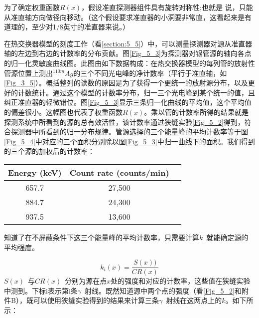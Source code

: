 为了确定权重函数$R(x)$，假设准直探测器组件具有旋转对称性;也就是 说，只能从准直轴方向做径向移动。（这个假设要求准直器的小洞要非常直，这看起来是有道理的，至少对1/8英寸的准直器来说。）

在热交换器模型的刻度工作（看\ref{section:5_5}）中，可以测量探测器对源从准直器轴的左边到右边的计数率的分布贡献。图\ref{Fig_5_3}为探测器对银管源的轴向各点的归一化灵敏度曲线图。此图由如下数据构成：在热交换器模型的每列管的放射性管源位置上测出$^{110m}Ag$的三个不同光电峰的净计数率（平行于准直轴，如\ref{Fig_3_5}）。概括整列的读数的原因是为了获得一个更统一的放射源分布，以及更好的计数统计。通过这个模型的计数率分布，归一三个光电峰到某个统一的值，且纠正准直器的轻微错位。图\ref{Fig_5_3}显示三条归一化曲线的平均值，这个平均值的偏差很小。这幅图也代表了权重函数$R(x)$。乘以管的计数率所得的结果就是探测系统中所看到的源的总有效活性，该计数率通过狭缝实验\ref{Fig_5_2}得到，符合探测器中所看到的归一分布规律。管源选择的三个能量峰的平均计数率等于图\ref{Fig_5_4}中对应的三个面积分别除以图\ref{Fig_5_3}中归一曲线下的面积。我们得到的三个源的加权后的计数率：

\begin{tabular}[c]{ccc}
\hline
Energy (keV)  &  Count rate (counts/min) \\
\hline
657.7  &  27,500  \\
884.7  &  24,300  \\
937.5  &  13,600  \\
\hline
\end{tabular}

知道了在不屏蔽条件下这三个能量峰的平均计数率，只需要计算$k$\ 就能确定源的平均强度。

\begin{equation}
\label{eq:equ6}
k_i(x)=\frac{S(x))}{CR(x)}
\end{equation}
$S(x)$\ 与$CR(x)$\ 分别为源在点$x$处的强度和对应的计数率，这些值在狭缝实验中测到。下标i表示第i条$\gamma$\ 射线。既然知道源中两个点的强度（看\ref{Fig_5_2}和附件B），既可以使用狭缝实验得到的结果来计算三条$\gamma$\ 射线在这两点上的$k$。如下所示：

